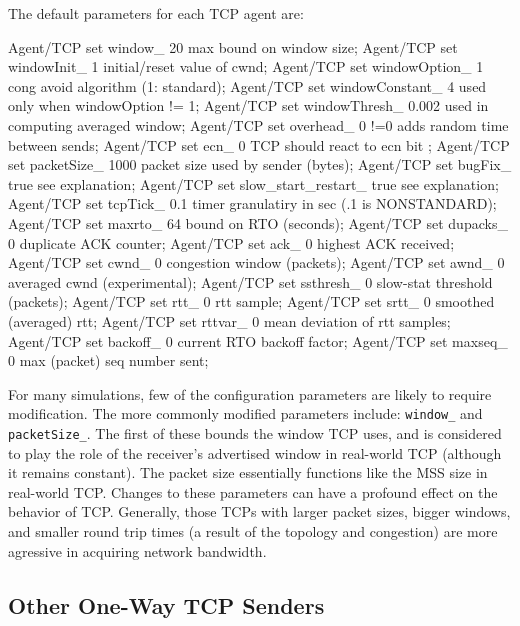 The default parameters for each TCP agent are:
\begin{program}
Agent/TCP set window_   20              \; max bound on window size;
Agent/TCP set windowInit_ 1             \; initial/reset value of cwnd;
Agent/TCP set windowOption_ 1           \; cong avoid algorithm (1: standard);
Agent/TCP set windowConstant_ 4         \; used only when windowOption != 1;
Agent/TCP set windowThresh_ 0.002       \; used in computing averaged window;
Agent/TCP set overhead_ 0               \; !=0 adds random time between sends;
Agent/TCP set ecn_ 0                    \; TCP should react to ecn bit ;
Agent/TCP set packetSize_ 1000          \; packet size used by sender (bytes);
Agent/TCP set bugFix_ true              \; see explanation;
Agent/TCP set slow_start_restart_ true  \; see explanation;
Agent/TCP set tcpTick_ 0.1              \; timer granulatiry in sec (.1 is NONSTANDARD);
Agent/TCP set maxrto_ 64                \; bound on RTO (seconds);
Agent/TCP set dupacks_ 0                \; duplicate ACK counter;
Agent/TCP set ack_ 0                    \; highest ACK received;
Agent/TCP set cwnd_ 0                   \; congestion window (packets);
Agent/TCP set awnd_ 0                   \; averaged cwnd (experimental);
Agent/TCP set ssthresh_ 0               \; slow-stat threshold (packets);
Agent/TCP set rtt_ 0                    \; rtt sample;
Agent/TCP set srtt_ 0                   \; smoothed (averaged) rtt;
Agent/TCP set rttvar_ 0                 \; mean deviation of rtt samples;
Agent/TCP set backoff_ 0                \; current RTO backoff factor;
Agent/TCP set maxseq_ 0                 \; max (packet) seq number sent;
\end{program}

For many simulations, few of the configuration parameters are likely
to require modification.
The more commonly modified parameters include: {\tt window\_} and
{\tt packetSize\_}.
The first of these bounds the window TCP uses, and is considered
to play the role of the receiver's advertised window in real-world
TCP (although it remains constant).
The packet size essentially functions like the MSS size in real-world
TCP.
Changes to these parameters can have a profound effect on the behavior
of TCP.
Generally, those TCPs with larger packet sizes, bigger windows, and
smaller round trip times (a result of the topology and congestion) are
more agressive in acquiring network bandwidth.

\subsection{Other One-Way TCP Senders}

